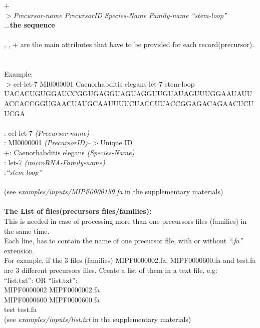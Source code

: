 \documentclass[a4paper,20pt]{report}
\newcommand*\circled[1]{\tikz[baseline=(char.base)]{
            \node[shape=circle,draw,inner sep=2pt] (char) {#1};}}
\newcommand*{\rom}[1]{\uppercase\expandafter{\romannumeral #1\relax}}
\begin{document}
\rom{1}\hspace{2.5cm}\rom{2} \hspace{1.5cm}\rom{3}+\rom{4} \hspace{1cm}\rom{5} \hspace{1.8cm}\rom{6}\\
$>$\textit{Precursor-name PrecursorID Species-Name Family-name ``stem-loop'}'\\
...\textbf{the sequence}\\ \\
\noindent
\rom{1}, \rom{2}, \rom{3}+\rom{4} are the main attributes that have to be provided for each record(precursor).\\\\\\
Example:\\
$>$cel-let-7 MI0000001 Caenorhabditis elegans let-7 stem-loop\\
UACACUGUGGAUCCGGUGAGGUAGUAGGUUGUAUAGUUUGGAAUAUUACCACCGGUGAACUAUGCAAUUUUCUACCUUACCGGAGACAGAACUCUUCGA\\\\
\rom{1}: cel-let-7 \textit{(Precursor-name)}\\ 
\rom{2}: MI0000001 \textit{(PrecursorID)}--$>$Unique ID \\
\rom{3}+\rom{4}: Caenorhabditis elegans \textit{(Species-Name)} \\
\rom{5}: let-7 \textit{(microRNA-Family-name)} \\
\rom{6}:\textit{``stem-loop''}\\\\
(see \textit{examples/inputs/MIPF0000159.fa} in the supplementary materials)\\\\
\noindent
\textbf{The List of files(precursors files/families):}\\
This is needed in case of processing more than one precursors files (families) in the same time.\\
Each line, has to contain the name of one precursor file, with or without \textit{``.fa''} extension.\\
For example, if the 3 files (families) MIPF0000002.fa, MIPF0000600.fa and test.fa are 3 different precursors files.
Create a list of them in a text file, e.g: \\
``list.txt'': \hspace{0.5 cm} OR ``list.txt'':\\
MIPF0000002  \hspace{0.58 cm}      MIPF0000002.fa\\
MIPF0000600  \hspace{0.58 cm}            MIPF0000600.fa\\    
test         \hspace{2.2 cm}            test.fa\\
(see \textit{examples/inputs/list.txt} in the supplementary materials)
\end{document}
